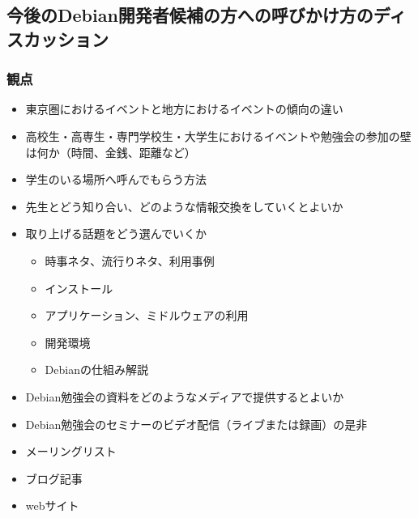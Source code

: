 \documentclass[mingoth,a4paper]{jsarticle}
\begin{document}
\subsection{今後のDebian開発者候補の方への呼びかけ方のディスカッション}

\subsubsection{観点}

  
\begin{itemize}
\item 東京圏におけるイベントと地方におけるイベントの傾向の違い
\item 高校生・高専生・専門学校生・大学生におけるイベントや勉強会の参加の壁は何か（時間、金銭、距離など）
\item 学生のいる場所へ呼んでもらう方法
\item 先生とどう知り合い、どのような情報交換をしていくとよいか
\end{itemize}


\begin{itemize}
\item 取り上げる話題をどう選んでいくか
  \begin{itemize}
  \item 時事ネタ、流行りネタ、利用事例
  \item インストール
  \item アプリケーション、ミドルウェアの利用
  \item 開発環境
  \item Debianの仕組み解説
  \end{itemize}
\item Debian勉強会の資料をどのようなメディアで提供するとよいか
\item Debian勉強会のセミナーのビデオ配信（ライブまたは録画）の是非
\end{itemize}


\begin{itemize}
\item メーリングリスト
\item ブログ記事
\item webサイト
\end{itemize}

\end{document}
